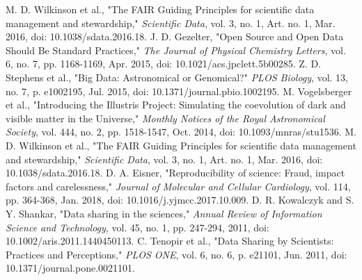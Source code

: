 \documentclass[conference]{IEEEtran}
\begin{document}
\begin{thebibliography}{00}
 M. D. Wilkinson et al., "The FAIR Guiding Principles for scientific data management and stewardship," \textit{Scientific Data}, vol. 3, no. 1, Art. no. 1, Mar. 2016, doi: 10.1038/sdata.2016.18.
 J. D. Gezelter, "Open Source and Open Data Should Be Standard Practices," \textit{The Journal of Physical Chemistry Letters}, vol. 6, no. 7, pp. 1168-1169, Apr. 2015, doi: 10.1021/acs.jpclett.5b00285.
 Z. D. Stephens et al., "Big Data: Astronomical or Genomical?" \textit{PLOS Biology}, vol. 13, no. 7, p. e1002195, Jul. 2015, doi: 10.1371/journal.pbio.1002195.
 M. Vogelsberger et al., "Introducing the Illustris Project: Simulating the coevolution of dark and visible matter in the Universe," \textit{Monthly Notices of the Royal Astronomical Society}, vol. 444, no. 2, pp. 1518-1547, Oct. 2014, doi: 10.1093/mnras/stu1536.
 M. D. Wilkinson et al., "The FAIR Guiding Principles for scientific data management and stewardship," \textit{Scientific Data}, vol. 3, no. 1, Art. no. 1, Mar. 2016, doi: 10.1038/sdata.2016.18.
 D. A. Eisner, "Reproducibility of science: Fraud, impact factors and carelessness," \textit{Journal of Molecular and Cellular Cardiology}, vol. 114, pp. 364-368, Jan. 2018, doi: 10.1016/j.yjmcc.2017.10.009.
 D. R. Kowalczyk and S. Y. Shankar, "Data sharing in the sciences," \textit{Annual Review of Information Science and Technology}, vol. 45, no. 1, pp. 247-294, 2011, doi: 10.1002/aris.2011.1440450113.
 C. Tenopir et al., "Data Sharing by Scientists: Practices and Perceptions," \textit{PLOS ONE}, vol. 6, no. 6, p. e21101, Jun. 2011, doi: 10.1371/journal.pone.0021101.
\end{thebibliography}
\vspace{12pt}
\end{document}
